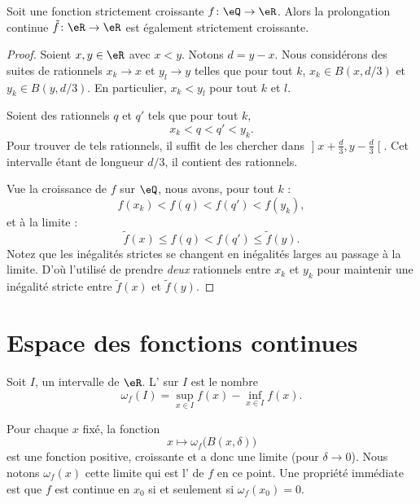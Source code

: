 \begin{proposition}      \label{PROPooTNIAooNAJDzL}
	Soit une fonction strictement croissante \( f\colon \eQ\to \eR\). Alors la prolongation continue \( \tilde f\colon \eR\to \eR\) est également strictement croissante.
\end{proposition}

\begin{proof}
	Soient \( x,y\in \eR\) avec \( x<y\). Notons \( d=y-x\). Nous considérons des suites de rationnels \( x_k\to x\) et \( y_l\to y\) telles que pour tout \( k\), \( x_k\in B(x,d/3)\) et \( y_k\in B(y,d/3)\). En particulier, \( x_k<y_l\) pour tout \( k\) et \( l\).

	Soient des rationnels \( q\) et \( q'\) tels que pour tout \( k\),
	\begin{equation}
		x_k<q<q'<y_k.
	\end{equation}
	Pour trouver de tels rationnels, il suffit de les chercher dans \( \mathopen] x+\frac{ d }{ 3 } , y-\frac{ d }{ 3 } \mathclose[\). Cet intervalle étant de longueur \( d/3\), il contient des rationnels.

	Vue la croissance de \( f\) sur \( \eQ\), nous avons, pour tout \( k\) :
	\begin{equation}
		f(x_k)<f(q)<f(q')<f(y_k),
	\end{equation}
	et à la limite :
	\begin{equation}
		\tilde f(x)\leq f(q)<f(q')\leq \tilde f(y).
	\end{equation}
	Notez que les inégalités strictes se changent en inégalités larges au passage à la limite. D'où l'utilisé de prendre \emph{deux} rationnels entre \( x_k\) et \( y_k\) pour maintenir une inégalité stricte entre \(\tilde f(x)\) et \( \tilde f(y)\).
\end{proof}


\section{Espace des fonctions continues}

\begin{definition}
	Soit \( I\), un intervalle de \( \eR\). L' sur \( I\) est le nombre
	\begin{equation}
		\omega_f(I)=\sup_{x\in I}f(x)-\inf_{x\in I}f(x).
	\end{equation}
\end{definition}
Pour chaque \( x\) fixé, la fonction
\begin{equation}
	x\mapsto \omega_f\big( B(x,\delta) \big)
\end{equation}
est une fonction positive, croissante et a donc une limite (pour \( \delta\to 0\)). Nous notons \( \omega_f(x)\) cette limite qui est l' de \( f\) en ce point. Une propriété immédiate est que \( f\) est continue en \( x_0\) si et seulement si \( \omega_f(x_0)=0\).

